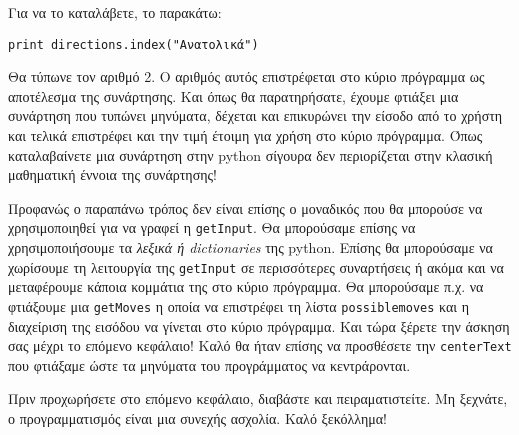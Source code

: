 Για να το καταλάβετε, το παρακάτω:

\begin{verbatim}
print directions.index("Ανατολικά")
\end{verbatim}

Θα τύπωνε τον αριθμό 2. Ο αριθμός αυτός επιστρέφεται στο κύριο πρόγραμμα
ως αποτέλεσμα της συνάρτησης. Και όπως θα παρατηρήσατε, έχουμε φτιάξει
μια συνάρτηση που τυπώνει μηνύματα, δέχεται και επικυρώνει την είσοδο
από το χρήστη και τελικά επιστρέφει και την τιμή έτοιμη για χρήση στο
κύριο πρόγραμμα. Όπως καταλαβαίνετε μια συνάρτηση στην python σίγουρα
δεν περιορίζεται στην κλασική μαθηματική έννοια της συνάρτησης!

Προφανώς ο παραπάνω τρόπος δεν είναι επίσης ο μοναδικός που θα μπορούσε
να χρησιμοποιηθεί για να γραφεί η {\tt getInput}. Θα μπορούσαμε επίσης να
χρησιμοποιήσουμε τα {\em λεξικά ή dictionaries} της python.
Επίσης θα μπορούσαμε να χωρίσουμε τη λειτουργία
της {\tt getInput} σε περισσότερες συναρτήσεις ή ακόμα και να
μεταφέρουμε κάποια κομμάτια της στο κύριο πρόγραμμα. Θα μπορούσαμε π.χ.
να φτιάξουμε μια {\tt getMoves} η οποία να επιστρέφει τη λίστα
{\tt possiblemoves} και η διαχείριση της εισόδου να γίνεται στο κύριο
πρόγραμμα. Και τώρα ξέρετε\texttrademark{} την άσκηση σας μέχρι το επόμενο
κεφάλαιο! Καλό θα ήταν επίσης να προσθέσετε την {\tt centerText} που
φτιάξαμε ώστε τα μηνύματα του προγράμματος να κεντράρονται.

Πριν προχωρήσετε στο επόμενο κεφάλαιο, διαβάστε και πειραματιστείτε. Μη ξεχνάτε, ο προγραμματισμός είναι μια συνεχής ασχολία. Καλό ξεκόλλημα!
